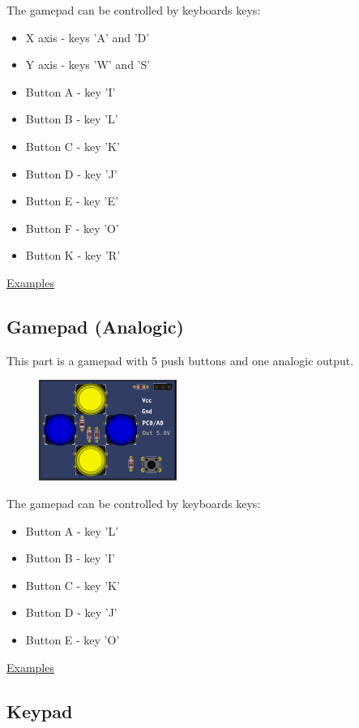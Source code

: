 The gamepad can be controlled by keyboards keys:
\begin{itemize}
 \item X axis - keys 'A' and 'D'
 \item Y axis - keys 'W' and 'S'
 \item Button A - key 'I'
 \item Button B - key 'L'
 \item Button C - key 'K'
 \item Button D - key 'J'
 \item Button E - key 'E'
 \item Button F - key 'O'
 \item Button K - key 'R'
\end{itemize}


\href{https://lcgamboa.github.io/picsimlab_examples/Parts.html\#Gamepad}{Examples}

\subsection{Gamepad (Analogic)}

This part is a gamepad with 5 push buttons and one analogic output.

\begin{figure}[H]
\center
\includegraphics[width=0.4\textwidth]{img/part_gamepad_an.png} 
\end{figure} 


The gamepad can be controlled by keyboards keys:
\begin{itemize}
 \item Button A - key 'L'
 \item Button B - key 'I'
 \item Button C - key 'K'
 \item Button D - key 'J'
 \item Button E - key 'O'
 \end{itemize}


\href{https://lcgamboa.github.io/picsimlab_examples/Parts.html\#Gamepad_(Analogic)}{Examples}

\subsection{Keypad}

